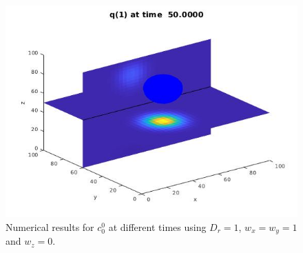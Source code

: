 \begin{frame}
\begin{figure}[H]
\begin{minipage}{0.4\textwidth}
				\includegraphics[scale=0.26]{Bilder_3D/Example_1Glocke_t=50_T22}
			\end{minipage}
			\caption{Numerical results for $c^0_0$ at different times using $D_r=1$, $w_x=w_y=1$ and $w_z=0$.}
		\end{figure}
\end{frame}
